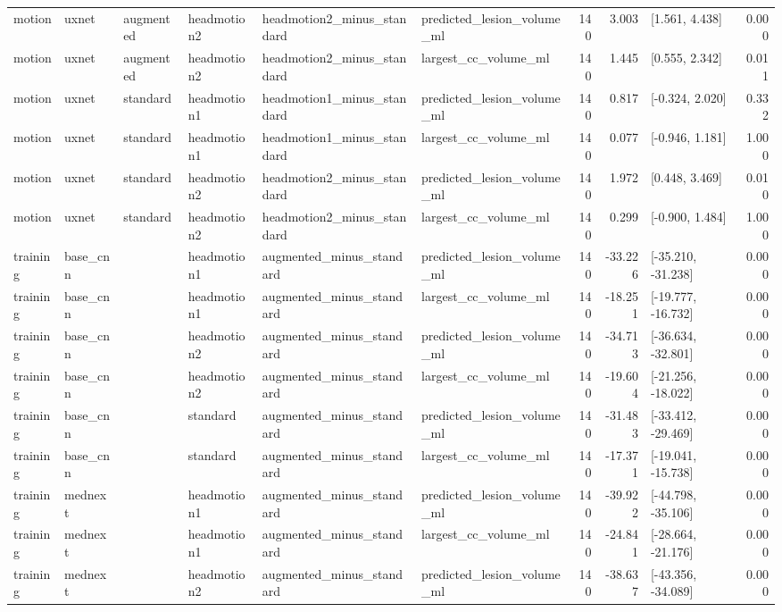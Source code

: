 \begin{table}
\begin{tabular}{llllllrrlr}
motion & uxnet & augmented & headmotion2 & headmotion2\_minus\_standard & predicted\_lesion\_volume\_ml & 140 & 3.003 & [1.561, 4.438] & 0.000 \\
motion & uxnet & augmented & headmotion2 & headmotion2\_minus\_standard & largest\_cc\_volume\_ml & 140 & 1.445 & [0.555, 2.342] & 0.011 \\
motion & uxnet & standard & headmotion1 & headmotion1\_minus\_standard & predicted\_lesion\_volume\_ml & 140 & 0.817 & [-0.324, 2.020] & 0.332 \\
motion & uxnet & standard & headmotion1 & headmotion1\_minus\_standard & largest\_cc\_volume\_ml & 140 & 0.077 & [-0.946, 1.181] & 1.000 \\
motion & uxnet & standard & headmotion2 & headmotion2\_minus\_standard & predicted\_lesion\_volume\_ml & 140 & 1.972 & [0.448, 3.469] & 0.010 \\
motion & uxnet & standard & headmotion2 & headmotion2\_minus\_standard & largest\_cc\_volume\_ml & 140 & 0.299 & [-0.900, 1.484] & 1.000 \\
training & base\_cnn &  & headmotion1 & augmented\_minus\_standard & predicted\_lesion\_volume\_ml & 140 & -33.226 & [-35.210, -31.238] & 0.000 \\
training & base\_cnn &  & headmotion1 & augmented\_minus\_standard & largest\_cc\_volume\_ml & 140 & -18.251 & [-19.777, -16.732] & 0.000 \\
training & base\_cnn &  & headmotion2 & augmented\_minus\_standard & predicted\_lesion\_volume\_ml & 140 & -34.713 & [-36.634, -32.801] & 0.000 \\
training & base\_cnn &  & headmotion2 & augmented\_minus\_standard & largest\_cc\_volume\_ml & 140 & -19.604 & [-21.256, -18.022] & 0.000 \\
training & base\_cnn &  & standard & augmented\_minus\_standard & predicted\_lesion\_volume\_ml & 140 & -31.483 & [-33.412, -29.469] & 0.000 \\
training & base\_cnn &  & standard & augmented\_minus\_standard & largest\_cc\_volume\_ml & 140 & -17.371 & [-19.041, -15.738] & 0.000 \\
training & mednext &  & headmotion1 & augmented\_minus\_standard & predicted\_lesion\_volume\_ml & 140 & -39.922 & [-44.798, -35.106] & 0.000 \\
training & mednext &  & headmotion1 & augmented\_minus\_standard & largest\_cc\_volume\_ml & 140 & -24.841 & [-28.664, -21.176] & 0.000 \\
training & mednext &  & headmotion2 & augmented\_minus\_standard & predicted\_lesion\_volume\_ml & 140 & -38.637 & [-43.356, -34.089] & 0.000 \\

\end{tabular}
\end{table}
